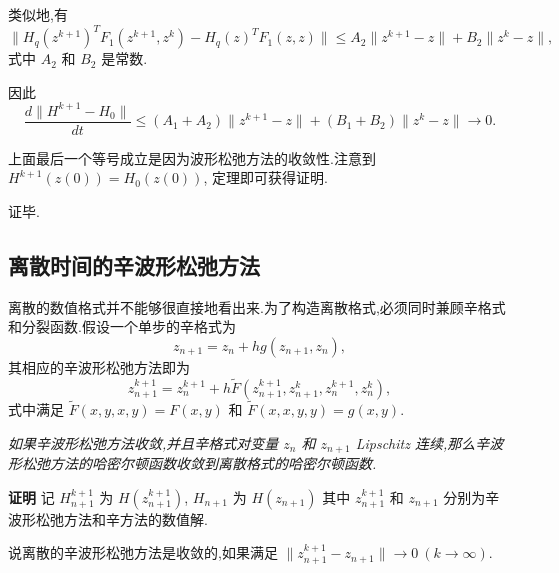 类似地,有
\begin{equation*}
\|H_q(z^{k+1})^TF_1(z^{k+1},z^{k})-H_q(z)^TF_1(z,z)\|\le A_2\|z^{k+1}-z\|+B_2\|z^{k}-z\|,
\end{equation*}
式中 $A_2$ 和 $B_2$ 是常数.

因此
\begin{equation*}
\frac{d\|H^{k+1}-H_0\|}{dt}\le (A_1+A_2)\|z^{k+1}-z\|+(B_1+B_2)\|z^{k}-z\| \to 0.
\end{equation*}

上面最后一个等号成立是因为波形松弛方法的收敛性.注意到 $H^{k+1}(z(0))=H_0(z(0))$, 定理即可获得证明.

证毕.

\subsection{离散时间的辛波形松弛方法}
离散的数值格式并不能够很直接地看出来.为了构造离散格式,必须同时兼顾辛格式和分裂函数.假设一个单步的辛格式为
\begin{equation*}
z_{n+1}=z_{n}+h g(z_{n+1},z_{n}),
\end{equation*}
其相应的辛波形松弛方法即为
\begin{equation}\label{eq:discrete}
z_{n+1}^{k+1}=z_{n}^{k+1}+h \tilde{F}(z_{n+1}^{k+1},z_{n+1}^{k},z_{n}^{k+1},z_{n}^{k}),
\end{equation}
式中满足 $\tilde{F}(x,y,x,y)=F(x,y)$ 和 $\tilde{F}(x,x,y,y)=g(x,y)$.

\begin{theorem}
\emph{如果辛波形松弛方法收敛,并且辛格式对变量 $z_{n}$ 和 $z_{n+1}$ Lipschitz 连续,那么辛波形松弛方法的哈密尔顿函数收敛到离散格式的哈密尔顿函数.}
\end{theorem}

{\textbf{证明}} 记 $H^{k+1}_{n+1}$ 为 $H(z_{n+1}^{k+1})$, $H_{n+1}$ 为 $H(z_{n+1})$ 其中 $z_{n+1}^{k+1}$ 和 $z_{n+1}$ 分别为辛波形松弛方法和辛方法的数值解.

说离散的辛波形松弛方法是收敛的,如果满足 $\|z_{n+1}^{k+1} - z_{n+1}\| \to 0~(k \to \infty)$.

